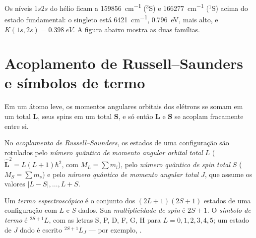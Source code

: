 \begin{example}\label{ex:b3:many-electron-atoms:K}
Os níveis $1s2s$ do hélio ficam a \qty{159856}{cm^{-1}} (${}^3$S) e
\qty{166277}{cm^{-1}} (${}^1$S) acima do estado fundamental: o singleto está
\qty{6421}{cm^{-1}}, \qty{0.796}{eV}, mais alto, e $K(1s,2s) = \qty{0.398}{eV}$.
A figura abaixo mostra as duas famílias.
\end{example}

\section{Acoplamento de Russell--Saunders e símbolos de termo}

Em um átomo leve, os momentos angulares orbitais dos elétrons se somam em
um total $\mathbf L$, seus spins em um total $\mathbf S$, e só então
$\mathbf L$ e $\mathbf S$ se acoplam fracamente entre si.

\begin{definition}\label{def:b3:many-electron-atoms:russell-saunders}
No \emph{acoplamento de Russell--Saunders}, os
estados de uma configuração são rotulados pelo \emph{número quântico de momento
angular orbital total}
$L$ ($\hat{\mathbf L}^2 = L(L+1)\hbar^2$, com $M_L = \sum m_l$), pelo \emph{número
quântico de spin total} $S$ ($M_S = \sum m_s$)
e pelo \emph{número quântico de momento angular total}
$J$, que assume os valores $|L - S|, \dots, L + S$.
\end{definition}

\begin{definition}\label{def:b3:many-electron-atoms:term}
Um \emph{termo espectroscópico} é o conjunto dos
$(2L+1)(2S+1)$ estados de uma configuração com $L$ e $S$ dados. Sua
\emph{multiplicidade de spin} é $2S + 1$. O \emph{símbolo de termo}
é ${}^{2S+1}L$, com as letras S, P, D, F, G, H
para $L = 0, 1, 2, 3, 4, 5$; um estado de $J$ dado é escrito ${}^{2S+1}L_J$ ---
por exemplo, .
\end{definition}

